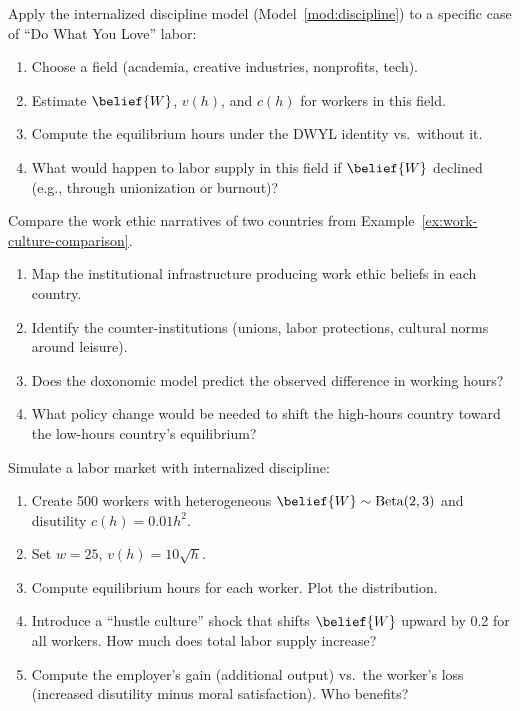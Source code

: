 \begin{exercise}
Apply the internalized discipline model (Model~\ref{mod:discipline}) to a specific case of ``Do What You Love'' labor:
\begin{enumerate}[nosep]
  \item Choose a field (academia, creative industries, nonprofits, tech).
  \item Estimate $\belief{W}$, $v(h)$, and $c(h)$ for workers in this field.
  \item Compute the equilibrium hours under the DWYL identity vs.\ without it.
  \item What would happen to labor supply in this field if $\belief{W}$ declined (e.g., through unionization or burnout)?
\end{enumerate}
\end{exercise}

\begin{exercise}
Compare the work ethic narratives of two countries from Example~\ref{ex:work-culture-comparison}.
\begin{enumerate}[nosep]
  \item Map the institutional infrastructure producing work ethic beliefs in each country.
  \item Identify the counter-institutions (unions, labor protections, cultural norms around leisure).
  \item Does the doxonomic model predict the observed difference in working hours?
  \item What policy change would be needed to shift the high-hours country toward the low-hours country's equilibrium?
\end{enumerate}
\end{exercise}

\begin{exercise}[Computational]
Simulate a labor market with internalized discipline:
\begin{enumerate}[nosep]
  \item Create 500 workers with heterogeneous $\belief{W} \sim \text{Beta}(2, 3)$ and disutility $c(h) = 0.01 h^2$.
  \item Set $w = 25$, $v(h) = 10 \sqrt{h}$.
  \item Compute equilibrium hours for each worker. Plot the distribution.
  \item Introduce a ``hustle culture'' shock that shifts $\belief{W}$ upward by 0.2 for all workers. How much does total labor supply increase?
  \item Compute the employer's gain (additional output) vs.\ the worker's loss (increased disutility minus moral satisfaction). Who benefits?
\end{enumerate}
\end{exercise}
